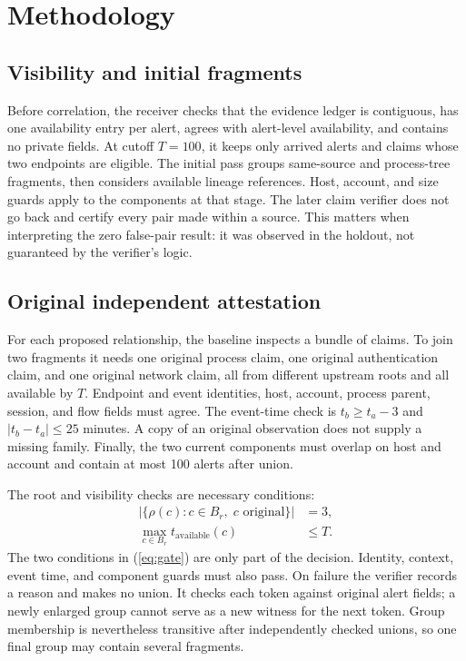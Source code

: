 \section{Methodology}\label{sec:method}
\subsection{Visibility and initial fragments}
Before correlation, the receiver checks that the evidence ledger is contiguous, has one availability entry per alert, agrees with alert-level availability, and contains no private fields. At cutoff $T=100$, it keeps only arrived alerts and claims whose two endpoints are eligible. The initial pass groups same-source and process-tree fragments, then considers available lineage references. Host, account, and size guards apply to the components at that stage. The later claim verifier does not go back and certify every pair made within a source. This matters when interpreting the zero false-pair result: it was observed in the holdout, not guaranteed by the verifier's logic.

\subsection{Original independent attestation}
For each proposed relationship, the baseline inspects a bundle of claims. To join two fragments it needs one original process claim, one original authentication claim, and one original network claim, all from different upstream roots and all available by $T$. Endpoint and event identities, host, account, process parent, session, and flow fields must agree. The event-time check is $t_b\geq t_a-3$ and $|t_b-t_a|\leq25$ minutes. A copy of an original observation does not supply a missing family. Finally, the two current components must overlap on host and account and contain at most 100 alerts after union.

The root and visibility checks are necessary conditions:
\begin{equation}\label{eq:gate}
\begin{aligned}
\left|\{\rho(c):c\in B_r,\;c\text{ original}\}\right|&=3,\\
\max_{c\in B_r}t_{\mathrm{available}}(c)&\leq T.
\end{aligned}
\end{equation}
The two conditions in (\ref{eq:gate}) are only part of the decision. Identity, context, event time, and component guards must also pass. On failure the verifier records a reason and makes no union. It checks each token against original alert fields; a newly enlarged group cannot serve as a new witness for the next token. Group membership is nevertheless transitive after independently checked unions, so one final group may contain several fragments.

